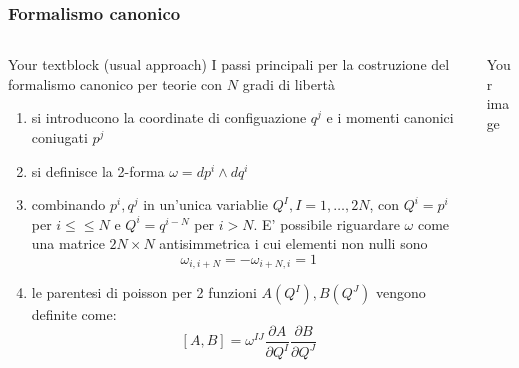 \documentclass{beamer}
\begin{document}
	\begin{frame}
		\frametitle{Formalismo canonico}
  			\begin{columns}[T]
    			\begin{column}{.5\textwidth}
     				\begin{block}{Your textblock}
						(usual approach) I passi principali per la costruzione del formalismo canonico per teorie con $N$ gradi di libertà
						\begin{enumerate}
							\item si introducono la coordinate di configuazione $q^j$ e i momenti canonici coniugati $p^j$
							\item si definisce la 2-forma $\omega = dp^i \wedge dq^i$
							\item combinando $p^i,q^j$ in un'unica variablie $Q^I , I = 1,\ldots,2N$, con $Q^i=p^i$ per $i\leq\leq N$ e $Q^i= q^{i-N}$ per $i>N$. E' possibile riguardare $\omega$ come una matrice $2N \times N$  antisimmetrica i cui elementi non nulli sono
								\begin{displaymath}
									\omega_{i , i+N} = -\omega_{i+N,i} = 1
								\end{displaymath}
							\item le parentesi di poisson per 2 funzioni $A(Q^I) , B(Q^J)$ vengono definite come:
								\begin{displaymath}
									\left[ A , B \right] = \omega^{I J} \frac{\partial A}{\partial Q^I} \frac{\partial B}{\partial Q^J}					
								\end{displaymath}
						\end{enumerate}
    				\end{block}
    			\end{column}
    		   	\begin{column}{.5\textwidth}
			    	\begin{block}{Your image}

\end{block}
\end{column}
\end{columns}
\end{frame}
\end{document}
